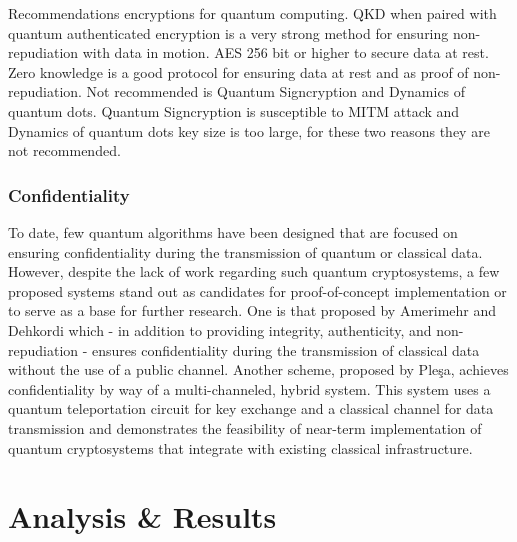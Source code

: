 \documentclass[sigconf]{acmart}
\begin{document}
Recommendations encryptions for quantum computing. QKD when paired with quantum authenticated encryption is a very strong method for ensuring non-repudiation with data in motion. AES 256 bit or higher to secure data at rest. Zero knowledge is a good protocol for ensuring data at rest and as proof of non-repudiation. Not recommended is Quantum Signcryption and Dynamics of quantum dots. Quantum Signcryption is susceptible to MITM attack and Dynamics of quantum dots key size is too large, for these two reasons they are not recommended.

\subsubsection{Confidentiality} %
To date, few quantum algorithms have been designed that are focused on ensuring confidentiality during the transmission of quantum or classical data. However, despite the lack of work regarding such quantum cryptosystems, a few proposed systems stand out as candidates for proof-of-concept implementation or to serve as a base for further research. One is that proposed by Amerimehr and Dehkordi which - in addition to providing integrity, authenticity, and non-repudiation - ensures confidentiality during the transmission of classical data without the use of a public channel\cite{amerimehr_quantum_2018}. Another scheme, proposed by Pleşa, achieves confidentiality by way of a multi-channeled, hybrid system\cite{plesa_hybrid_2017}. This system uses a quantum teleportation circuit for key exchange and a classical channel for data transmission and demonstrates the feasibility of near-term implementation of quantum cryptosystems that integrate with existing classical infrastructure.

\section{Analysis \& Results}
\end{document}
